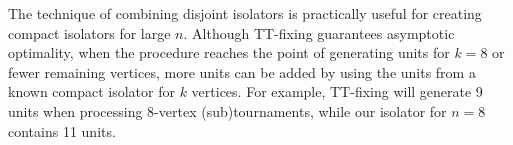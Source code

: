 \documentclass[conference]{IEEEtran}
\begin{document}


The technique of combining disjoint isolators is practically useful for creating compact isolators for large $n$. Although TT-fixing guarantees asymptotic optimality, when the procedure reaches the point of generating units for $k=8$ or fewer remaining vertices, more units can be added by using the units from a known compact isolator for $k$ vertices. For example, TT-fixing will generate 9 units when processing 8-vertex (sub)tournaments, while our isolator for $n=8$ contains 11 units. 


\end{document}
